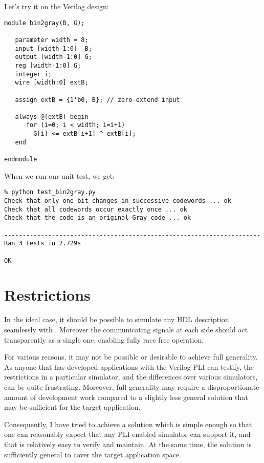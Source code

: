 Let's try it on the Verilog design:

\begin{verbatim}
module bin2gray(B, G);

   parameter width = 8;
   input [width-1:0]  B;
   output [width-1:0] G;
   reg [width-1:0] G;
   integer i;
   wire [width:0] extB;

   assign extB = {1'b0, B}; // zero-extend input

   always @(extB) begin
      for (i=0; i < width; i=i+1)
        G[i] <= extB[i+1] ^ extB[i];
   end

endmodule

\end{verbatim}

When we run our unit test, we get:

\begin{verbatim}
% python test_bin2gray.py 
Check that only one bit changes in successive codewords ... ok
Check that all codewords occur exactly once ... ok
Check that the code is an original Gray code ... ok

----------------------------------------------------------------------
Ran 3 tests in 2.729s

OK

\end{verbatim}


\section{Restrictions}

In the ideal case, it should be possible to simulate
any HDL description seamlessly with \myhdl{}. Moreover
the communicating signals at each side should act
transparently as a single one, enabling fully race free
operation.

For various reasons, it may not be possible or desirable
to achieve full generality. As anyone that has developed
applications with the Verilog PLI can testify, the
restrictions in a particular simulator, and the 
differences over various simulators, can be quite 
frustrating. Moreover, full generality may require
a disproportionate amount of development work compared
to a slightly less general solution that may
be sufficient for the target application.

Consequently, I have tried to achieve a solution
which is simple enough so that one can reasonably 
expect that any PLI-enabled simulator can support it,
and that is relatively easy to verify and maintain.
At the same time, the solution is sufficiently general 
to cover the target application space.

